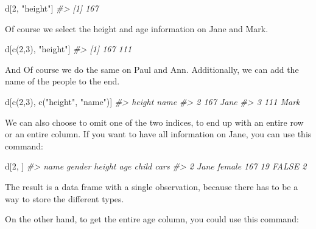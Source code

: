 \documentclass[
]{book}
\newenvironment{Shaded}{\begin{snugshade}}{\end{snugshade}}
\newcommand{\CommentTok}[1]{\textcolor[rgb]{0.56,0.35,0.01}{\textit{#1}}}
\newcommand{\DecValTok}[1]{\textcolor[rgb]{0.00,0.00,0.81}{#1}}
\newcommand{\FunctionTok}[1]{\textcolor[rgb]{0.00,0.00,0.00}{#1}}
\newcommand{\NormalTok}[1]{#1}
\newcommand{\StringTok}[1]{\textcolor[rgb]{0.31,0.60,0.02}{#1}}
\begin{document}
\begin{Shaded}
\begin{Highlighting}[]
\NormalTok{d[}\DecValTok{2}\NormalTok{, }\StringTok{"height"}\NormalTok{]}
\CommentTok{\#\textgreater{} [1] 167}
\end{Highlighting}
\end{Shaded}

Of course we select the height and age information on Jane and Mark.

\begin{Shaded}
\begin{Highlighting}[]
\NormalTok{d[}\FunctionTok{c}\NormalTok{(}\DecValTok{2}\NormalTok{,}\DecValTok{3}\NormalTok{), }\StringTok{"height"}\NormalTok{]}
\CommentTok{\#\textgreater{} [1] 167 111}
\end{Highlighting}
\end{Shaded}

And Of course we do the same on Paul and Ann. Additionally, we can add the name of the people to the end.

\begin{Shaded}
\begin{Highlighting}[]
\NormalTok{d[}\FunctionTok{c}\NormalTok{(}\DecValTok{2}\NormalTok{,}\DecValTok{3}\NormalTok{), }\FunctionTok{c}\NormalTok{(}\StringTok{"height"}\NormalTok{, }\StringTok{"name"}\NormalTok{)]}
\CommentTok{\#\textgreater{}   height name}
\CommentTok{\#\textgreater{} 2    167 Jane}
\CommentTok{\#\textgreater{} 3    111 Mark}
\end{Highlighting}
\end{Shaded}

We can also choose to omit one of the two indices, to end up with an entire row or an entire column. If you want to have all information on Jane, you can use this command:

\begin{Shaded}
\begin{Highlighting}[]
\NormalTok{d[}\DecValTok{2}\NormalTok{, ]}
\CommentTok{\#\textgreater{}   name gender height age child cars}
\CommentTok{\#\textgreater{} 2 Jane female    167  19 FALSE    2}
\end{Highlighting}
\end{Shaded}

The result is a data frame with a single observation, because there has to be a way to store the different types.

On the other hand, to get the entire age column, you could use this command:
\end{document}
